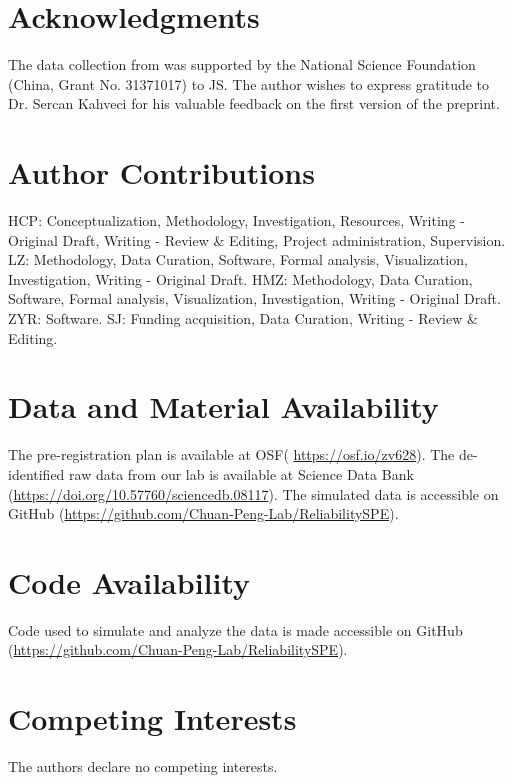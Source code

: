 \documentclass[sn-apa]{sn-jnl}%
\theoremstyle{thmstyleone}%
\theoremstyle{thmstyletwo}%
\theoremstyle{thmstylethree}%
\begin{document}
\section*{Acknowledgments}

The data collection from \textcite{hu2023data} was supported by the National Science Foundation (China, Grant No. 31371017) to JS. The author wishes to express gratitude to Dr. Sercan Kahveci for his valuable feedback on the first version of the preprint. 

\section*{Author Contributions}

HCP: Conceptualization, Methodology, Investigation, Resources, Writing - Original Draft, Writing - Review \& Editing, Project administration, Supervision. LZ: Methodology, Data Curation, Software, Formal analysis, Visualization, Investigation, Writing - Original Draft. HMZ: Methodology, Data Curation, Software, Formal analysis, Visualization, Investigation, Writing - Original Draft. ZYR: Software. SJ: Funding acquisition, Data Curation, Writing - Review \& Editing.

\section*{Data and Material Availability}

The pre-registration plan is available at OSF( \url{https://osf.io/zv628}). The de-identified raw data from our lab is available at Science Data Bank (\url{https://doi.org/10.57760/sciencedb.08117}). The simulated data is accessible on GitHub (\url{https://github.com/Chuan-Peng-Lab/ReliabilitySPE}). 

\section*{Code Availability}

Code used to simulate and analyze the data is made accessible on GitHub (\url{https://github.com/Chuan-Peng-Lab/ReliabilitySPE}). 

\section*{Competing Interests}

The authors declare no competing interests.
\end{document}
